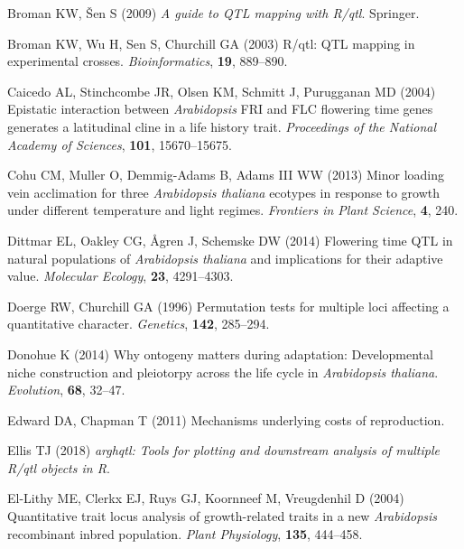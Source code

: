 \documentclass[
]{article}
\begin{document}
\leavevmode\hypertarget{ref-Broman2009}{}%
Broman KW, Šen S (2009) \emph{A guide to QTL mapping with R/qtl}. Springer.

\leavevmode\hypertarget{ref-Broman2003}{}%
Broman KW, Wu H, Sen S, Churchill GA (2003) R/qtl: QTL mapping in experimental crosses. \emph{Bioinformatics}, \textbf{19}, 889--890.

\leavevmode\hypertarget{ref-caicedo2004epistatic}{}%
Caicedo AL, Stinchcombe JR, Olsen KM, Schmitt J, Purugganan MD (2004) Epistatic interaction between \emph{Arabidopsis} FRI and FLC flowering time genes generates a latitudinal cline in a life history trait. \emph{Proceedings of the National Academy of Sciences}, \textbf{101}, 15670--15675.

\leavevmode\hypertarget{ref-cohu2013minor}{}%
Cohu CM, Muller O, Demmig-Adams B, Adams III WW (2013) Minor loading vein acclimation for three \emph{Arabidopsis thaliana} ecotypes in response to growth under different temperature and light regimes. \emph{Frontiers in Plant Science}, \textbf{4}, 240.

\leavevmode\hypertarget{ref-dittmar2014flowering}{}%
Dittmar EL, Oakley CG, Ågren J, Schemske DW (2014) Flowering time QTL in natural populations of \emph{Arabidopsis thaliana} and implications for their adaptive value. \emph{Molecular Ecology}, \textbf{23}, 4291--4303.

\leavevmode\hypertarget{ref-doerge1996permutation}{}%
Doerge RW, Churchill GA (1996) Permutation tests for multiple loci affecting a quantitative character. \emph{Genetics}, \textbf{142}, 285--294.

\leavevmode\hypertarget{ref-donohue2014ontogeny}{}%
Donohue K (2014) Why ontogeny matters during adaptation: Developmental niche construction and pleiotorpy across the life cycle in \emph{Arabidopsis thaliana}. \emph{Evolution}, \textbf{68}, 32--47.

\leavevmode\hypertarget{ref-edward2011mechanisms}{}%
Edward DA, Chapman T (2011) Mechanisms underlying costs of reproduction.

\leavevmode\hypertarget{ref-ellis_arghqtl}{}%
Ellis TJ (2018) \emph{\textup{arghqtl}: Tools for plotting and downstream analysis of multiple R/qtl objects in R}.

\leavevmode\hypertarget{ref-el2004quantitative}{}%
El-Lithy ME, Clerkx EJ, Ruys GJ, Koornneef M, Vreugdenhil D (2004) Quantitative trait locus analysis of growth-related traits in a new \emph{Arabidopsis} recombinant inbred population. \emph{Plant Physiology}, \textbf{135}, 444--458.
\end{document}
